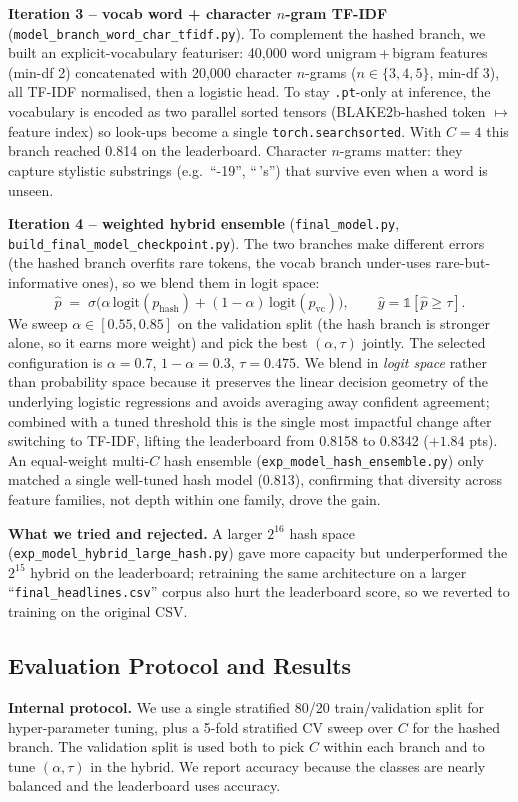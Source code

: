 \documentclass[10pt]{article}
\begin{document}
\textbf{Iteration 3 -- vocab word + character $n$-gram TF-IDF} (\texttt{model\_branch\_word\_char\_tfidf.py}). To complement the hashed branch, we built an explicit-vocabulary featuriser: 40{,}000 word unigram\,+\,bigram features (min-df 2) concatenated with 20{,}000 character $n$-grams ($n\in\{3,4,5\}$, min-df 3), all TF-IDF normalised, then a logistic head. To stay \texttt{.pt}-only at inference, the vocabulary is encoded as two parallel sorted tensors (BLAKE2b-hashed token $\mapsto$ feature index) so look-ups become a single \texttt{torch.searchsorted}. With $C=4$ this branch reached 0.814 on the leaderboard. Character $n$-grams matter: they capture stylistic substrings (e.g.\ ``-19'', ``\,'s'') that survive even when a word is unseen.

\textbf{Iteration 4 -- weighted hybrid ensemble} (\texttt{final\_model.py}, \texttt{build\_final\_model\_checkpoint.py}). The two branches make different errors (the hashed branch overfits rare tokens, the vocab branch under-uses rare-but-informative ones), so we blend them in logit space:
\[
\hat{p} \;=\; \sigma\!\Big( \alpha\,\mathrm{logit}(p_{\text{hash}}) + (1-\alpha)\,\mathrm{logit}(p_{\text{vc}}) \Big), \qquad \hat{y} = \mathbb{1}[\hat{p} \ge \tau].
\]
We sweep $\alpha\in[0.55,0.85]$ on the validation split (the hash branch is stronger alone, so it earns more weight) and pick the best $(\alpha,\tau)$ jointly. The selected configuration is $\alpha=0.7$, $1-\alpha=0.3$, $\tau=0.475$. We blend in \emph{logit space} rather than probability space because it preserves the linear decision geometry of the underlying logistic regressions and avoids averaging away confident agreement; combined with a tuned threshold this is the single most impactful change after switching to TF-IDF, lifting the leaderboard from 0.8158 to 0.8342 ($+1.84$ pts). An equal-weight multi-$C$ hash ensemble (\texttt{exp\_model\_hash\_ensemble.py}) only matched a single well-tuned hash model (0.813), confirming that diversity across feature families, not depth within one family, drove the gain.

\textbf{What we tried and rejected.} A larger $2^{16}$ hash space (\texttt{exp\_model\_hybrid\_large\_hash.py}) gave more capacity but underperformed the $2^{15}$ hybrid on the leaderboard; retraining the same architecture on a larger ``\texttt{final\_headlines.csv}'' corpus also hurt the leaderboard score, so we reverted to training on the original CSV.

\subsection{Evaluation Protocol and Results}\label{sec:eval}
\textbf{Internal protocol.} We use a single stratified 80/20 train/validation split for hyper-parameter tuning, plus a 5-fold stratified CV sweep over $C$ for the hashed branch. The validation split is used both to pick $C$ within each branch and to tune $(\alpha,\tau)$ in the hybrid. We report accuracy because the classes are nearly balanced and the leaderboard uses accuracy.
\end{document}
